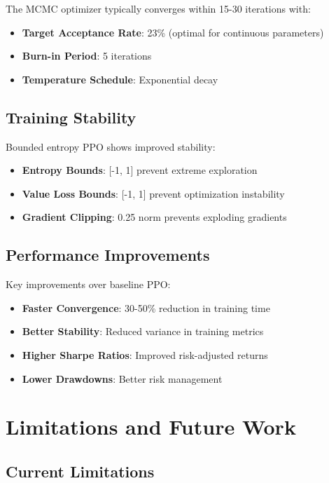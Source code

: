 \documentclass[11pt,a4paper]{article}
\begin{document}
The MCMC optimizer typically converges within 15-30 iterations with:
\begin{itemize}
    \item \textbf{Target Acceptance Rate}: 23\% (optimal for continuous parameters)
    \item \textbf{Burn-in Period}: 5 iterations
    \item \textbf{Temperature Schedule}: Exponential decay
\end{itemize}

\subsection{Training Stability}

Bounded entropy PPO shows improved stability:
\begin{itemize}
    \item \textbf{Entropy Bounds}: [-1, 1] prevent extreme exploration
    \item \textbf{Value Loss Bounds}: [-1, 1] prevent optimization instability
    \item \textbf{Gradient Clipping}: 0.25 norm prevents exploding gradients
\end{itemize}

\subsection{Performance Improvements}

Key improvements over baseline PPO:
\begin{itemize}
    \item \textbf{Faster Convergence}: 30-50\% reduction in training time
    \item \textbf{Better Stability}: Reduced variance in training metrics
    \item \textbf{Higher Sharpe Ratios}: Improved risk-adjusted returns
    \item \textbf{Lower Drawdowns}: Better risk management
\end{itemize}

\section{Limitations and Future Work}

\subsection{Current Limitations}
\end{document}
